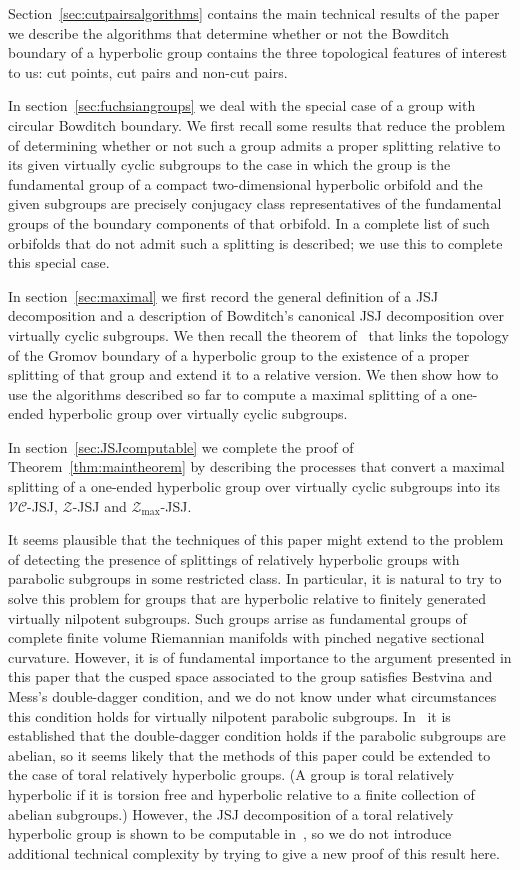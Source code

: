 Section~\ref{sec:cutpairsalgorithms} contains the main technical results of the
paper we describe the algorithms that determine whether or not the Bowditch
boundary of a hyperbolic group contains the three topological features of
interest to us: cut points, cut pairs and non-cut pairs.

In section~\ref{sec:fuchsiangroups} we deal with the special case of a group
with circular Bowditch boundary. We first recall some results that reduce the
problem of determining whether or not such a group admits a proper
splitting relative to its given virtually cyclic subgroups to the case in which the
group is the fundamental group of a compact two-dimensional hyperbolic orbifold
and the given subgroups are precisely conjugacy class representatives of the
fundamental groups of the boundary components of that orbifold. In
\cite{guirardellevitt16} a complete list of such orbifolds that do not admit
such a splitting is described; we use this to complete this special case.

In section~\ref{sec:maximal} we first record the general definition of a JSJ
decomposition and a description of Bowditch's canonical JSJ decomposition over
virtually cyclic subgroups. We then recall the theorem of~\cite{bowditch98}
that links the topology of the Gromov boundary of a hyperbolic group to the
existence of a proper splitting of that group and extend it to a relative
version. We then show how to use the algorithms described so far to compute a
maximal splitting of a one-ended hyperbolic group over virtually cyclic
subgroups.

In section~\ref{sec:JSJcomputable} we complete the proof of
Theorem~\ref{thm:maintheorem} by describing the processes that convert a
maximal splitting of a one-ended hyperbolic group over virtually cyclic
subgroups into its $\mathcal{VC}$-JSJ, $\mathcal{Z}$-JSJ and
$\mathcal{Z}_\text{max}$-JSJ.

It seems plausible that the techniques of this paper might extend to the
problem of detecting the presence of splittings of relatively hyperbolic groups
with parabolic subgroups in some restricted class. In particular, it is natural
to try to solve this problem for groups that are hyperbolic relative to
finitely generated virtually nilpotent subgroups. Such groups arrise as
fundamental groups of complete finite volume Riemannian manifolds with pinched
negative sectional curvature. However, it is of fundamental importance to the
argument presented in this paper that the cusped space associated to the group
satisfies Bestvina and Mess's double-dagger condition, and we do not know under
what circumstances this condition holds for virtually nilpotent parabolic
subgroups. In~\cite{dahmanigroves08a} it is established that the double-dagger
condition holds if the parabolic subgroups are abelian, so it seems likely that
the methods of this paper could be extended to the case of toral relatively
hyperbolic groups. (A group is toral relatively hyperbolic if it is torsion
free and hyperbolic relative to a finite collection of abelian subgroups.)
However, the JSJ decomposition of a toral relatively hyperbolic group is shown
to be computable in~\cite{dahmanitouikan13}, so we do not introduce additional
technical complexity by trying to give a new proof of this result here.

